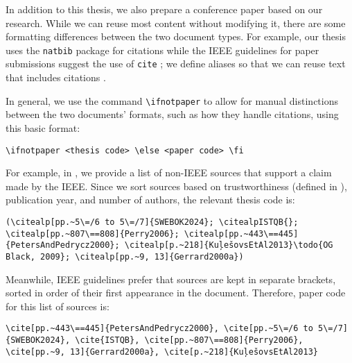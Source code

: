 

\label{paper-macros}
In addition to this thesis, we also prepare a conference paper based on our
research. While we can reuse most content without modifying it, there are some
formatting differences between the two document types. For example, our thesis
uses the \texttt{natbib} package for citations while the IEEE guidelines for
paper submissions suggest the use of \texttt{cite} \citep[p.~8]{Shell2015};
we define aliases so that we can reuse text that includes citations
.

In general, we use the command
\texttt{\textbackslash ifnotpaper} to allow for manual distinctions between the
two documents' formats, such as how they handle citations, using this basic format:
\begin{displayquote}
    \texttt{\textbackslash ifnotpaper <thesis code> \textbackslash else <paper code> \textbackslash fi}
\end{displayquote}
For example, in , we provide a list of non-IEEE sources
that support a claim made by the IEEE. Since we sort sources based on
trustworthiness (defined in ), publication year, and number of
authors, the relevant thesis code is:
\begin{displayquote}
    \texttt{(\textbackslash citealp[pp.\textasciitilde 5\textbackslash =/6 to 5\textbackslash =/7]\{SWEBOK2024\};
        \displayNL \textbackslash citealpISTQB\{\};
        \textbackslash citealp[pp.\textasciitilde 807\textbackslash ==808]\{Perry2006\};
        \displayNL \textbackslash citealp[pp.\textasciitilde 443\textbackslash ==445]\{PetersAndPedrycz2000\};
        \displayNL \textbackslash citealp[p.\textasciitilde 218]\{KuļešovsEtAl2013\}\textbackslash todo\{OG Black, 2009\};
        \displayNL \textbackslash citealp[pp.\textasciitilde 9, 13]\{Gerrard2000a\})}
\end{displayquote}
Meanwhile, IEEE guidelines prefer that sources are kept in separate brackets,
sorted in order of their first appearance in the document. Therefore, paper
code for this list of sources is:
\begin{displayquote}
    \texttt{\textbackslash cite[pp.\textasciitilde 443\textbackslash ==445]\{PetersAndPedrycz2000\},
        \displayNL \textbackslash cite[pp.\textasciitilde 5\textbackslash =/6 to 5\textbackslash =/7]\{SWEBOK2024\},
        \textbackslash cite\{ISTQB\},
        \displayNL \textbackslash cite[pp.\textasciitilde 807\textbackslash ==808]\{Perry2006\},
        \displayNL \textbackslash cite[pp.\textasciitilde 9, 13]\{Gerrard2000a\},
        \displayNL \textbackslash cite[p.\textasciitilde 218]\{KuļešovsEtAl2013\}}
\end{displayquote}
